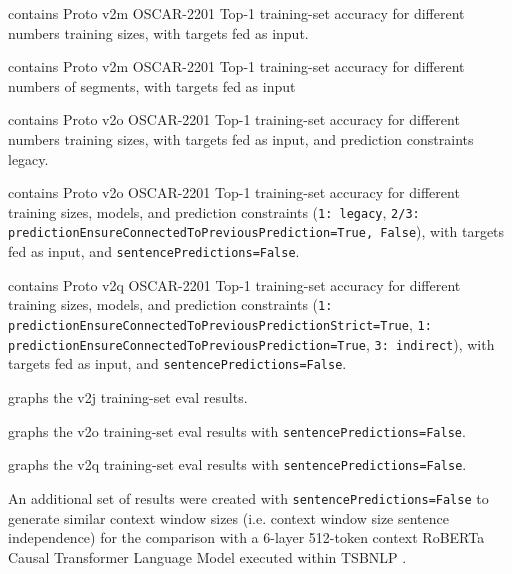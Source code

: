 contains Proto v2m OSCAR-2201 Top-1 training-set accuracy for different numbers training sizes, with targets fed as input.

 contains Proto v2m OSCAR-2201 Top-1 training-set accuracy for different numbers of segments, with targets fed as input

 contains Proto v2o OSCAR-2201 Top-1 training-set accuracy for different numbers training sizes, with targets fed as input, and prediction constraints legacy.

 contains Proto v2o OSCAR-2201 Top-1 training-set accuracy for different training sizes, models, and prediction constraints (\texttt{1: legacy}, \texttt{2/3: predictionEnsureConnectedToPreviousPrediction=True, False}), with targets fed as input, and \texttt{sentencePredictions=False}.

 contains Proto v2q OSCAR-2201 Top-1 training-set accuracy for different training sizes, models, and prediction constraints (\texttt{1: predictionEnsureConnectedToPreviousPredictionStrict=True}, \texttt{1: predictionEnsureConnectedToPreviousPrediction=True}, \texttt{3: indirect}), with targets fed as input, and \texttt{sentencePredictions=False}.

 graphs the v2j training-set eval results.

 graphs the v2o training-set eval results with \texttt{sentencePredictions=False}.

 graphs the v2q training-set eval results with \texttt{sentencePredictions=False}.

An additional set of results were created with \texttt{sentencePredictions=False} to generate similar context window sizes (i.e. context window size sentence independence) for the comparison with a 6-layer 512-token context RoBERTa Causal Transformer Language Model \citep{liu2019roberta} executed within TSBNLP \citep{bairesearch2022TSBNLP}.

